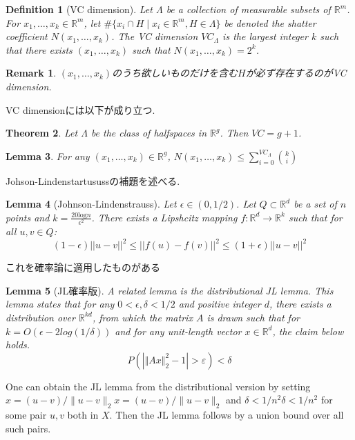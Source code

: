 \documentclass{ujarticle}
\newtheorem{thm}{Theorem}[section]
\newtheorem{dfn}[thm]{Definition}
\newtheorem{lem}[thm]{Lemma}
\newtheorem*{rem}{Remark}
\begin{document}
\begin{dfn}[VC dimension]
Let $\Lambda$ be a collection of measurable subsets of $\mathbb{R}^m$.
For $x_1,\dots,x_k \in \mathbb{R}^m$,
let $\#\{ x_i \cap H \mid x_i \in \mathbb{R}^m,H \in \Lambda\}$ be denoted the shatter coefficient $N(x_1, \dots, x_k)$.
The VC dimension $VC_{\Lambda}$
is the largest integer $k$ such that there exists $(x_1, \dots,x_k)$ such that $N(x_1,\dots, x_k) = 2^k$.
\end{dfn}
\begin{rem}
 $(x_1,\dots,x_k)$のうち欲しいものだけを含む$H$が必ず存在するのがVC dimension.
\end{rem}
VC dimensionには以下が成り立つ.
\begin{thm}
\label{vc}
 Let $\Lambda$ be the class of halfspaces in $\mathbb{R}^g$. Then $VC= g + 1$.
\end{thm}
\begin{lem}
  For any $(x_1,\dots, x_k) \in  \mathbb{R}^g$,
  $N(x_1,\dots, x_k)  \le \sum_{i=0}^{VC_{\Lambda}}  \binom{k}{i}$
\end{lem}

Johson-Lindenstartusussの補題を述べる.

\begin{lem}[Johnson-Lindenstrauss]
  Let $ \epsilon \in (0, 1/2)$. Let $Q ⊂ \mathbb{R}^d$ be a set of $n$ points and $k =\frac{20 \mathrm{log}n}{\epsilon^2}$.
  There exists a Lipshcitz mapping $f : \mathbb{R}^d \to \mathbb{R}^k$ such that for all $u, v \in Q$:
  \begin{equation*}
    (1 − \epsilon)||u − v||^2 \le ||f(u) − f(v)||^2 \le (1 + \epsilon )||u − v||^2
\end{equation*}
\end{lem}
これを確率論に適用したものがある
\begin{lem}[JL確率版]
A related lemma is the distributional JL lemma. This lemma states that for any
$0 <\epsilon, \delta<1/2$ and positive integer $d$, there exists a distribution over $\mathbb{R}^{kd}$,
from which the matrix $A$ is drawn such that for $k = O(\epsilon−2log(1/\delta))$ and for any unit-length vector $x  \in \mathbb{R}^d$,
the claim below holds.
\begin{equation*}
  {\displaystyle P(|\Vert Ax\Vert _{2}^{2}-1|>\varepsilon )<\delta }
\end{equation*}
\end{lem}
One can obtain the JL lemma from the distributional version by setting
${\displaystyle x=(u-v)/\|u-v\|_{2}} x=(u-v)/\|u-v\|_{2}$ and ${\displaystyle \delta <1/n^{2}} \delta <1/n^{2}$
for some pair $u,v$ both in $X$.
Then the JL lemma follows by a union bound over all such pairs.
\end{document}
